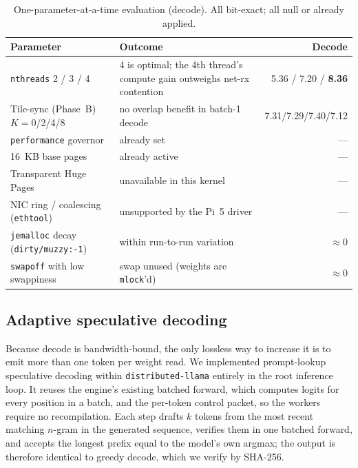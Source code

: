 \documentclass[10pt,a4paper]{article}
\begin{document}
\begin{table}[H]
\centering\small
\caption{One-parameter-at-a-time evaluation (decode). All bit-exact; all null or already applied.}
\label{tab:levers}
\begin{tabularx}{\textwidth}{p{4.4cm}X r}
\toprule
\textbf{Parameter} & \textbf{Outcome} & \textbf{Decode} \\
\midrule
\texttt{nthreads} 2 / 3 / 4 & 4 is optimal; the 4th thread's compute gain outweighs net-rx contention & 5.36 / 7.20 / \textbf{8.36} \\
Tile-sync (Phase~B) $K{=}$0/2/4/8 & no overlap benefit in batch-1 decode & 7.31/7.29/7.40/7.12 \\
\texttt{performance} governor & already set & --- \\
16~KB base pages & already active & --- \\
Transparent Huge Pages & unavailable in this kernel & --- \\
NIC ring / coalescing (\texttt{ethtool}) & unsupported by the Pi~5 driver & --- \\
\texttt{jemalloc} decay (\texttt{dirty/muzzy:-1}) & within run-to-run variation & $\approx$0 \\
\texttt{swapoff} with low swappiness & swap unused (weights are \texttt{mlock}'d) & $\approx$0 \\
\bottomrule
\end{tabularx}
\end{table}

\subsection{Adaptive speculative decoding}
\label{sec:spec}
Because decode is bandwidth-bound, the only lossless way to increase it is to emit more than one token per weight read. We implemented prompt-lookup speculative decoding within \texttt{distributed-llama} entirely in the root inference loop. It reuses the engine's existing batched forward, which computes logits for every position in a batch, and the per-token control packet, so the workers require no recompilation. Each step drafts $k$ tokens from the most recent matching $n$-gram in the generated sequence, verifies them in one batched forward, and accepts the longest prefix equal to the model's own argmax; the output is therefore identical to greedy decode, which we verify by SHA-256.
\end{document}
